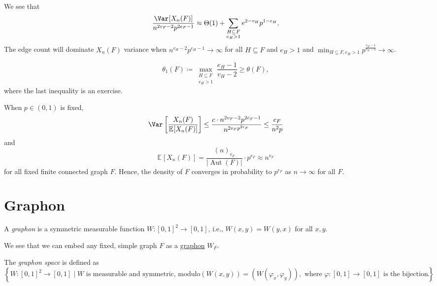 We see that
\[
	\frac{\Var_{}[X_n(F)] }{n^{2v_F - 2} p^{2e_F - 1}}
	\approx \Theta (1) + \sum_{\substack{H \subseteq F \\ e_H > 1}} e^{2 - v_H} p^{1 - e_H}.
\]
The edge count will dominate \(X_n(F)\) variance when \(n^{v_H - 2} p^{e_H - 1} \to \infty \) for all \(H \subseteq F\) and \(e_H > 1\) and \(\min _{H \subseteq F, e_H > 1} p^{\frac{e_H - 1}{v_H - 2}} \to \infty \).

\[
	\theta _1(F)
	\coloneqq \max _{\substack{H \subseteq F \\ e_H > 1}} \frac{e_H - 1}{v_H - 2}
	\geq \theta (F),
\]
where the last inequality is an exercise.


When \(p \in (0, 1)\) is fixed,
\[
	\Var_{}\left[\frac{X_n(F)}{\mathbb{E}_{}[X_n(F)] }\right]
	\leq \frac{c \cdot n^{2v_F - 2} p^{2e_F - 1}}{n^{2v_F p^{2e_F}}}
	\leq \frac{c_F}{n^{2} p}
\]
and
\[
	\mathbb{E}_{}[X_n(F)]
	= \frac{(n)_{v_F}}{\lvert \operatorname{Aut}(F)  \rvert } \cdot p^{e_F}
	\approx n^{v_F}
\]
for all fixed finite connected graph \(F\). Hence, the density of \(F\) converges in probability to \(p^{e_F}\) as \(n \to \infty \) for all \(F\).

\section{Graphon}
\begin{definition}[Graphon]\label{def:graphon}
	A \emph{graphon} is a symmetric measurable function \(W \colon [0, 1]^2 \to [0, 1]\), i.e., \(W(x, y) = W(y, x)\) for all \(x, y\).
\end{definition}

\begin{eg}[Triangle]

\end{eg}

\begin{eg}[Crossing]

\end{eg}

We see that we can embed any fixed, simple graph \(F\) as a \hyperref[def:graphon]{graphon} \(W_F\).

\begin{definition}\label{def:graph-space}
	The \emph{graphon space} is defined as
	\[
		\left\{ W\colon [0, 1]^2 \to [0, 1] \mid W\text{ is measurable and symmetric, modulo} (W(x, y)) = (W(\varphi _x, \varphi _y)), \text{ where \(\varphi \colon [0, 1] \to [0, 1] \) is the bijection}  \right\}.
	\]
\end{definition}

